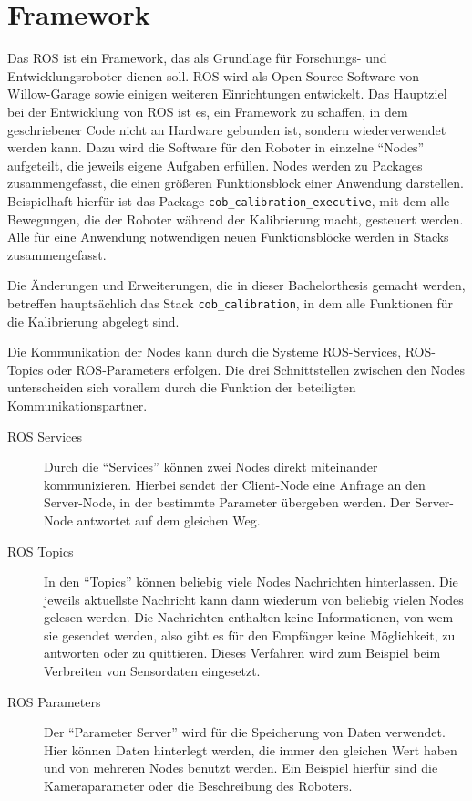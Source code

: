 \section{Framework}
\label{sec:ros}

Das \acf{ROS} ist ein Framework, das als Grundlage für Forschungs- und
Entwicklungsroboter dienen soll. \ac{ROS} wird als Open-Source Software von
Willow-Garage sowie einigen weiteren Einrichtungen entwickelt. Das Hauptziel bei
der Entwicklung von \ac{ROS} ist es, ein Framework zu schaffen, in dem
geschriebener Code nicht an Hardware gebunden ist, sondern wiederverwendet
werden kann. Dazu wird die Software für den Roboter in einzelne "`Nodes"'
aufgeteilt, die jeweils eigene Aufgaben erfüllen.
\newline Nodes werden zu Packages
zusammengefasst, die einen größeren Funktionsblock einer Anwendung darstellen.
Beispielhaft hierfür ist das Package \texttt{cob\_\allowbreak calibration\_\allowbreak executive}, mit
dem alle Bewegungen, die der Roboter während der Kalibrierung macht, gesteuert
werden.
\newline Alle für eine Anwendung notwendigen neuen Funktionsblöcke werden in
Stacks zusammengefasst. 

Die Änderungen und Erweiterungen, die in dieser
Bachelorthesis gemacht werden, betreffen hauptsächlich das Stack
\texttt{cob\_calibration}, in dem alle Funktionen für die Kalibrierung abgelegt
sind. 

Die Kommunikation der Nodes kann durch die Systeme \ac{ROS}-Services, \ac{ROS}-Topics 
oder \ac{ROS}-Parameters erfolgen.
Die drei Schnittstellen zwischen den Nodes unterscheiden sich vorallem
durch die Funktion der beteiligten Kommunikationspartner. 

\begin{description}

  \item[\ac{ROS} Services] Durch die "`Services"' können zwei Nodes direkt
    miteinander kommunizieren. Hierbei sendet der Client-Node eine Anfrage an
    den Server-Node, in der bestimmte Parameter übergeben werden. Der
    Server-Node antwortet auf dem gleichen Weg.

  \item[\ac{ROS} Topics]In den "`Topics"' können beliebig
    viele Nodes Nachrichten hinterlassen. Die jeweils aktuellste
    Nachricht kann dann wiederum von beliebig vielen Nodes gelesen werden. Die
    Nachrichten enthalten keine Informationen, von wem sie gesendet werden, also
    gibt es für den Empfänger keine Möglichkeit, zu antworten oder zu quittieren.
    Dieses Verfahren wird zum Beispiel beim Verbreiten von Sensordaten
    eingesetzt.

  \item[\ac{ROS} Parameters]Der "`Parameter Server"' wird für die
    Speicherung von Daten verwendet. Hier können Daten hinterlegt werden, die
    immer den gleichen Wert haben und von mehreren Nodes benutzt werden. Ein
    Beispiel hierfür sind die Kameraparameter oder die Beschreibung des
    Roboters. 

\end{description}

